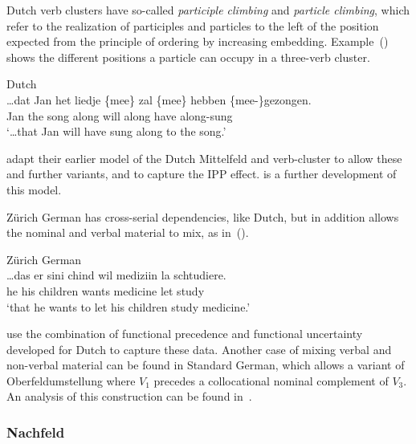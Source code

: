 \documentclass[output=paper,hidelinks]{langscibook}
\begin{document}
Dutch verb clusters have so-called \textit{participle climbing} and
\textit{particle climbing}, which refer to the realization of
participles and particles to the left of the position expected from
the principle of ordering by increasing embedding. Example~()
shows the different positions a particle can occupy in a three-verb
cluster.
%
\begin{exe}
  \ex\label{ex:particleclimbing} Dutch\\
  \gll \ldots{}dat Jan {het liedje} \{mee\} zal \{mee\} hebben \{mee-\}gezongen.\\
       \phantom{\ldots}\COMP{} Jan {the song} \phantom{(}along will \phantom{(}along have \phantom{(}along-sung\\
       \glt `\ldots that Jan will have sung along to the song.'
\end{exe}
%
\citet{KaplanZaenen2003} adapt their earlier model of the
Dutch Mittelfeld and verb-cluster to allow these and further variants,
and to capture the IPP effect. \citet{poortvliet:2015:lfg} is a
further development of this model.

Zürich German has cross-serial dependencies, like Dutch, but in
addition allows the nominal and verbal material to mix, as in~().
\begin{exe}
  \ex Zürich German\\
  \gll \ldots{}das er sini chind wil mediziin la schtudiere.\\
       \phantom{\ldots}\COMP{} he his children wants medicine let study\\
       \glt `that he wants to let his children study medicine.'
  \end{exe}
%
\citet{zaenen-kaplan1995} use the combination of functional precedence
and functional uncertainty developed for Dutch to capture these
data. Another case of mixing verbal and non-verbal material can be
found in Standard German, which allows a variant of Oberfeldumstellung
where $V_1$ precedes a collocational nominal complement of $V_3$. An
analysis of this construction can be found
in~\citet{cook:2001:revdiss}.


\subsubsection{Nachfeld\label{sec:Germanic:nf}}
\end{document}
